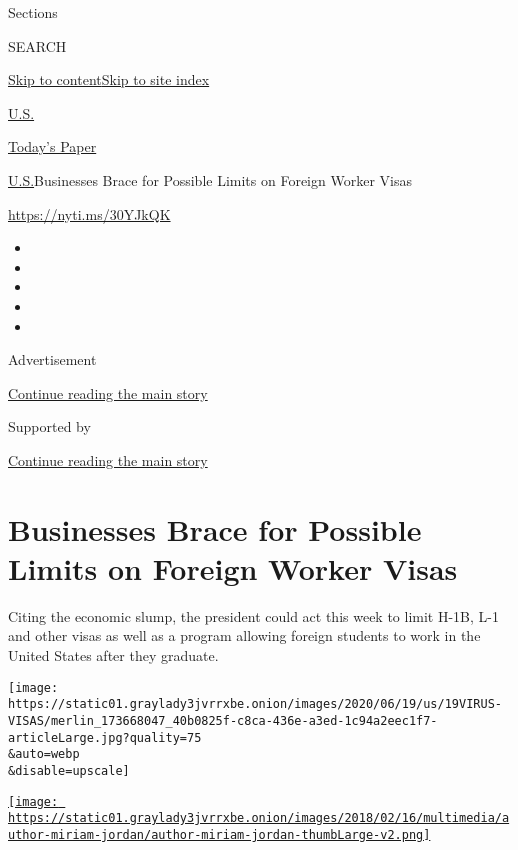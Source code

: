 Sections

SEARCH

\protect\hyperlink{site-content}{Skip to
content}\protect\hyperlink{site-index}{Skip to site index}

\href{https://www.nytimes3xbfgragh.onion/section/us}{U.S.}

\href{https://myaccount.nytimes3xbfgragh.onion/auth/login?response_type=cookie\&client_id=vi}{}

\href{https://www.nytimes3xbfgragh.onion/section/todayspaper}{Today's
Paper}

\href{/section/us}{U.S.}\textbar{}Businesses Brace for Possible Limits
on Foreign Worker Visas

\url{https://nyti.ms/30YJkQK}

\begin{itemize}
\item
\item
\item
\item
\item
\end{itemize}

Advertisement

\protect\hyperlink{after-top}{Continue reading the main story}

Supported by

\protect\hyperlink{after-sponsor}{Continue reading the main story}

\hypertarget{businesses-brace-for-possible-limits-on-foreign-worker-visas}{%
\section{Businesses Brace for Possible Limits on Foreign Worker
Visas}\label{businesses-brace-for-possible-limits-on-foreign-worker-visas}}

Citing the economic slump, the president could act this week to limit
H-1B, L-1 and other visas as well as a program allowing foreign students
to work in the United States after they graduate.

\texttt{[image: https://static01.graylady3jvrrxbe.onion/images/2020/06/19/us/19VIRUS-VISAS/merlin\_173668047\_40b0825f-c8ca-436e-a3ed-1c94a2eec1f7-articleLarge.jpg?quality=75\\\&auto=webp\\\&disable=upscale]}

\href{https://www.nytimes3xbfgragh.onion/by/miriam-jordan/}{\texttt{[image: https://static01.graylady3jvrrxbe.onion/images/2018/02/16/multimedia/author-miriam-jordan/author-miriam-jordan-thumbLarge-v2.png]}}

